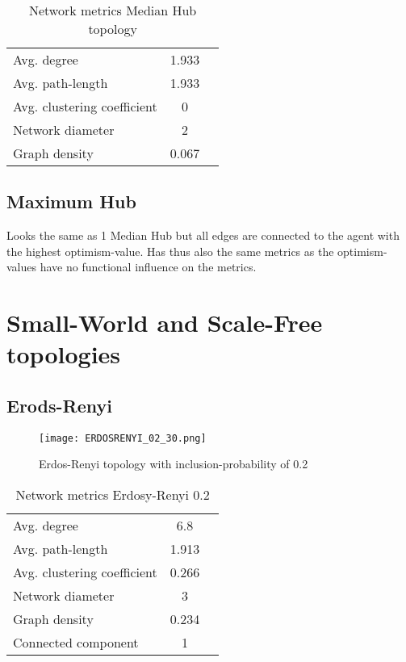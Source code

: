 \documentclass[Bachelorarbeit.tex]{subfiles}
\begin{document}
\begin{table}[h]
	\centering
	\caption{Network metrics Median Hub topology}
	\begin{tabular} { l c r }
		\hline
		Avg. degree & 1.933 \\
		Avg. path-length & 1.933 \\
		Avg. clustering coefficient & 0 \\
		Network diameter & 2 \\
		Graph density & 0.067 \\
		\hline
	\end{tabular}
\end{table}

\subsection{Maximum Hub}
Looks the same as 1 Median Hub but all edges are connected to the agent with the highest optimism-value.
Has thus also the same metrics as the optimism-values have no functional influence on the metrics.

\section{Small-World and Scale-Free topologies}
\subsection{Erods-Renyi}

\begin{figure}[H]
	\centering
  \texttt{[image: ERDOSRENYI\_02\_30.png]}
	\caption{Erdos-Renyi topology with inclusion-probability of 0.2}
	\label{fig:topology_ERDOSRENYI_02_30}
\end{figure}

\begin{table}[h]
	\centering
	\caption{Network metrics Erdosy-Renyi 0.2}
	\begin{tabular} { l c r }
		\hline
		Avg. degree & 6.8 \\
		Avg. path-length & 1.913 \\
		Avg. clustering coefficient &  0.266 \\
		Network diameter & 3 \\
		Graph density & 0.234 \\
		Connected component & 1 \\
		\hline
	\end{tabular}
\end{table}
\end{document}
